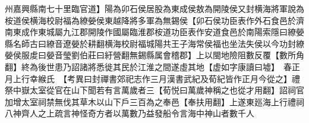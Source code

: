 州嘉興縣南七十里臨官道】陽為卯石侯居股為東成侯敖為開陵侯又封横海將軍說為桉道侯横海校尉福為繚嫈侯東越降將多軍為無錫侯【卯石侯功臣表作外石食邑於濟南東成作東城屬九江郡開陵作國屬臨淮郡桉道功臣表作安道食邑於南陽索隱曰繚嫈縣名師古曰繚音遼嫈於耕翻横海校尉福城陽共王子海常侯福也坐法失侯以今功封繚嫈侯服䖍曰嫈音瑩劉伯莊曰紆營翻無錫縣属會稽郡】上以閩地險阻數反覆【數所角翻】終為後世患乃詔諸將悉徙其民於江淮之間遂虛其地【虚如字康讀曰墟】　春正月上行幸緱氏　【考異曰封禪書郊祀志作三月漢書武紀及荀紀皆作正月今從之】禮祭中嶽太室從官在山下聞若有言萬歲者三【荀悦曰萬歲神稱之也從才用翻】詔祠官加增太室祠禁無伐其草木以山下戶三百為之奉邑【奉扶用翻】上遂東廵海上行禮祠八神齊人之上疏言神怪奇方者以萬數乃益發船令言海中神山者數千人
